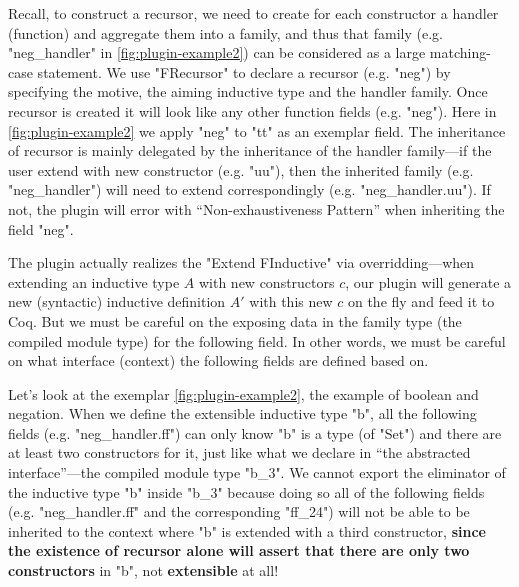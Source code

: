 Recall, to construct a recursor, we need to create for each
constructor a handler (function) and aggregate them into a family, and thus that family (e.g. "neg_handler" in \cref{fig:plugin-example2}) can be considered as a large matching-case statement. We use "FRecursor" to declare a recursor (e.g. "neg") by specifying the motive, the aiming inductive type and the handler family. Once recursor is created it will look like any other function fields (e.g. "neg"). Here in \cref{fig:plugin-example2} we apply "neg" to "tt" as an exemplar field. The inheritance of recursor is mainly delegated by the inheritance of the handler family---if the user extend with new constructor (e.g. "uu"), then the inherited family (e.g. "neg_handler") will need to extend correspondingly (e.g. "neg_handler.uu"). If not, the plugin will error with ``Non-exhaustiveness Pattern'' when inheriting the field "neg".

The plugin actually realizes the "Extend FInductive" via overridding---when extending an inductive type $A$
with new constructors $c$, our plugin will generate a new (syntactic) inductive definition $A'$ with this new $c$ on the fly and feed it to Coq. But we must be careful on the exposing data in the family type (the compiled module type) for the following field. In other words, we must be careful on what interface (context) the following fields are defined based on. 

Let's look at the exemplar \cref{fig:plugin-example2}, the example of boolean and negation. When we define the extensible inductive type "b", all the following fields (e.g. "neg_handler.ff") can only know "b" is a type (of "Set") and there are at least two constructors for it, just like what we declare in ``the abstracted interface''---the compiled module type "b_3". We cannot export
the eliminator of the inductive type "b" inside "b_3" because doing so all of the following fields (e.g. "neg_handler.ff" and the corresponding "ff_24") will not be able to be inherited to the context where "b"
is extended with a third constructor, \textbf{since the existence of recursor
alone will assert that there are only two constructors} in "b", not
\textbf{extensible} at all! 

